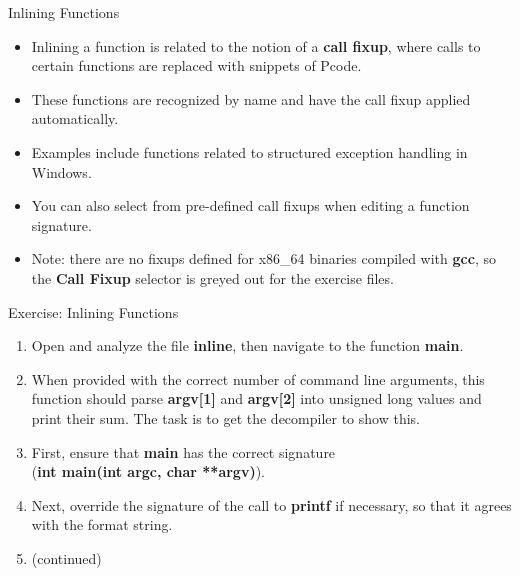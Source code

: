 \documentclass{beamer}
\begin{document}
\begin{frame}
\begin{block}{Inlining Functions}
\begin{itemize}
\item Inlining a function is related to the notion of a \textbf{call fixup}, where calls to certain functions are replaced with snippets of Pcode.  
\item These functions are recognized by name and have the call fixup applied automatically. 
\item Examples include functions related to structured exception handling in Windows.
\item You can also select from pre-defined call fixups when editing a function signature.
\item Note: there are no fixups defined for x86\_64 binaries compiled with \textbf{gcc}, so the \textbf{Call Fixup} selector is greyed out for the exercise files.
\end{itemize}
\end{block}
\end{frame}

\begin{frame}
\begin{block}{Exercise: Inlining Functions}
\begin{enumerate}
\item Open and analyze the file \textbf{inline}, then navigate to the function \textbf{main}.
\item When provided with the correct number of command line arguments, this function should parse \textbf{argv[1]} and \textbf{argv[2]} into unsigned long values and print their sum.
The task is to get the decompiler to show this.
\item First, ensure that \textbf{main} has the correct signature \\ (\textbf{int main(int argc, char **argv)}).
\item Next, override the signature of the call to \textbf{printf} if necessary, so that it agrees with the format string.
\item[] (continued) 
\end{enumerate}
\end{block}
\end{frame}
\end{document}
